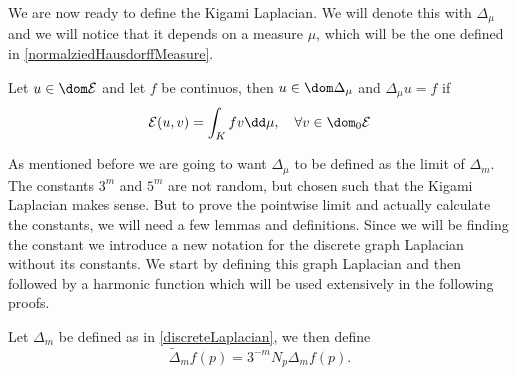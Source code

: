 We are now ready to define the Kigami Laplacian. We will denote this with $\Delta_{\mu}$ and we will notice that it depends on a measure $\mu$, which will be the one defined in \eqref{normalziedHausdorffMeasure}.
\begin{defi}
	Let $u \in \dom \mathcal{E}$ and let $f$ be continuos, then $u \in \dom \Delta_{\mu}$ and $\Delta_{\mu} u =f$ if
	\begin{equation}
		\mathcal{E}(u,v) = \int_{K}fv \dd \mu, \quad \forall v \in \dom_{0}\mathcal{E}
	\end{equation}
\end{defi}

As mentioned before  we are going to want $\Delta_{\mu}$ to be defined as the limit of $\Delta_m$. The constants $3^m$ and $5^m$ are not random, but chosen such that the Kigami Laplacian makes sense. But to prove the pointwise limit and actually calculate the constants, we will need a few lemmas and definitions. Since we will be finding the constant we introduce a new notation for the discrete graph Laplacian without its constants. We start by defining this graph Laplacian and then followed by a harmonic function which will be used extensively in the following proofs.

\begin{defi}
	Let $\Delta_{m}$ be defined as in \cref{discreteLaplacian}, we then define
	\begin{equation}
		\widetilde{\Delta}_{m}f(p) = 3^{-m} N_p \Delta_mf(p).
	\end{equation}
\end{defi}

